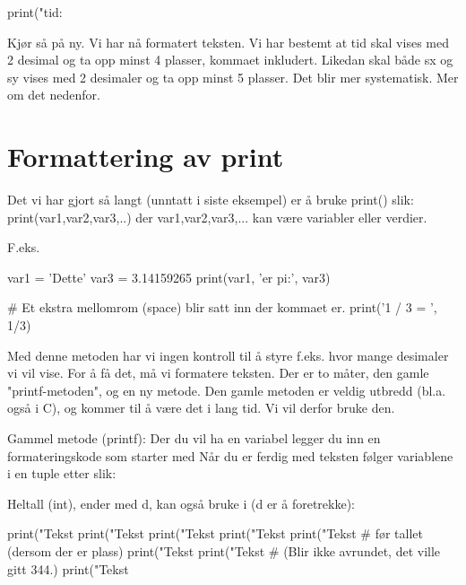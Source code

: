 {\begin{usncodebox}
print("tid: %
\end{usncodebox}

Kjør så på ny. Vi har nå formatert teksten. Vi har bestemt at tid skal vises med 2 desimal og ta opp minst 4 plasser, kommaet inkludert. Likedan skal både sx og sy vises med 2 desimaler og ta opp minst 5 plasser. Det blir mer systematisk. Mer om det nedenfor. 

\section{Formattering av print}

Det vi har gjort så langt (unntatt i siste eksempel) er å bruke print() slik: print(var1,var2,var3,..) der var1,var2,var3,... kan være variabler eller verdier.

F.eks.
\begin{usncodebox}
var1 = 'Dette'
var3 = 3.14159265
print(var1, 'er pi:', var3)

# Et ekstra mellomrom (space) blir satt inn der kommaet er. 
print('1 / 3 = ', 1/3)
\end{usncodebox}

Med denne metoden har vi ingen kontroll til å styre f.eks. hvor mange desimaler vi vil vise. For å få det, må vi formatere teksten. Der er to måter, den gamle "printf-metoden", og en ny metode. Den gamle metoden er veldig utbredd (bl.a. også i C), og kommer til å være det i lang tid. Vi vil derfor bruke den. 

Gammel metode (printf):
Der du vil ha en variabel legger du inn en formateringskode som starter 
med %
Når du er ferdig med teksten følger variablene i en tuple etter %
slik: %

Heltall (int), ender med d, kan også bruke i (d er å foretrekke):
\begin{usncodebox}
print("Tekst %
print("Tekst %
print("Tekst %
print("Tekst %
print("Tekst %
                                   # før tallet (dersom der er plass) 
print("Tekst %
print("Tekst %
                                   # (Blir ikke avrundet, det ville gitt 344.)  
print("Tekst %
\end{usncodebox}

}
